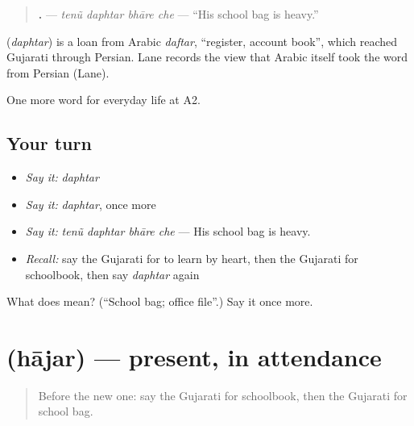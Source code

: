 \begin{quote}
\textbf{   .} — \emph{tenũ daphtar bhāre che} — \textquotedblleft{}His school bag is heavy.\textquotedblright{}
\end{quote}

\begin{cousinweb}
\textbf{} (\emph{daphtar}) is a loan from Arabic \emph{daftar}, \textquotedblleft{}register, account book\textquotedblright{}, which reached Gujarati through Persian. Lane records the view that Arabic itself took the word from Persian (Lane).
\end{cousinweb}

\begin{grammarlens}[title={What you've built}]
One more word for everyday life at A2.
\end{grammarlens}

\subsection*{Your turn}
\begin{itemize}
\raggedright
  \item \emph{Say it:} \emph{daphtar}
  \item \emph{Say it:} \emph{daphtar}, once more
  \item \emph{Say it:} \emph{tenũ daphtar bhāre che} — His school bag is heavy.
  \item \emph{Recall:} say the Gujarati for to learn by heart, then the Gujarati for schoolbook, then say \emph{daphtar} again
\end{itemize}

\begin{tcolorbox}[breakable,colback=teal!4,colframe=teal!35!black,title={Before you move on}]
What does  mean? (\textquotedblleft{}School bag; office file\textquotedblright{}.) Say it once more.
\end{tcolorbox}
\section[\texorpdfstring{\gu{હાજર} (hājar)}{હાજર (hājar)}]{ (hājar) — present, in attendance}

\label{lesson:GU-C243-hajar}



\begin{quote}
Before the new one: say the Gujarati for schoolbook, then the Gujarati for school bag.
\end{quote}

